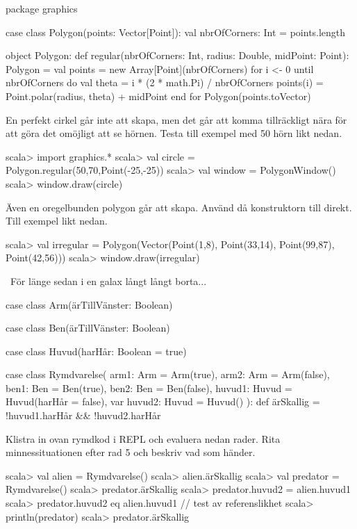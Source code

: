 \Subtask \begin{Code}
package graphics

case class Polygon(points: Vector[Point]):
  val nbrOfCorners: Int = points.length
  
object Polygon:
  def regular(nbrOfCorners: Int, radius: Double, midPoint: Point): Polygon =
    val points = new Array[Point](nbrOfCorners)
    for i <- 0 until nbrOfCorners do
      val theta = i * (2 * math.Pi) / nbrOfCorners
      points(i) = Point.polar(radius, theta) + midPoint
    end for
    Polygon(points.toVector)
\end{Code}

\Subtask 
En perfekt cirkel går inte att skapa, men det går att komma tillräckligt nära för att göra det omöjligt att se hörnen.
Testa till exempel med 50 hörn likt nedan.
\begin{REPL}
scala> import graphics.*
scala> val circle = Polygon.regular(50,70,Point(-25,-25))
scala> val window = PolygonWindow()
scala> window.draw(circle)
\end{REPL}

Även en oregelbunden polygon går att skapa. Använd då konstruktorn till  direkt. Till exempel likt nedan.
\begin{REPL}
scala> val irregular = 
         Polygon(Vector(Point(1,8), Point(33,14), Point(99,87), Point(42,56)))
scala> window.draw(irregular)
\end{REPL}

\QUESTEND





\QUESTBEGIN

\Task  \what~För länge sedan i en galax långt långt borta...

\begin{Code}
case class Arm(ärTillVänster: Boolean)

case class Ben(ärTillVänster: Boolean)

case class Huvud(harHår: Boolean = true)

case class Rymdvarelse(
      arm1:   Arm   = Arm(true),
      arm2:   Arm   = Arm(false),
      ben1:   Ben   = Ben(true),
      ben2:   Ben   = Ben(false),
      huvud1: Huvud = Huvud(harHår = false),
  var huvud2: Huvud = Huvud()
):
  def ärSkallig = !huvud1.harHår && !huvud2.harHår
\end{Code}

\Subtask Klistra in ovan rymdkod i REPL och evaluera nedan rader. Rita minnessituationen efter rad 5 och beskriv vad som händer.
\begin{REPL}
scala> val alien = Rymdvarelse()
scala> alien.ärSkallig
scala> val predator = Rymdvarelse()
scala> predator.ärSkallig
scala> predator.huvud2 = alien.huvud1
scala> predator.huvud2 eq alien.huvud1  // test av referenslikhet
scala> println(predator)
scala> predator.ärSkallig
\end{REPL}

